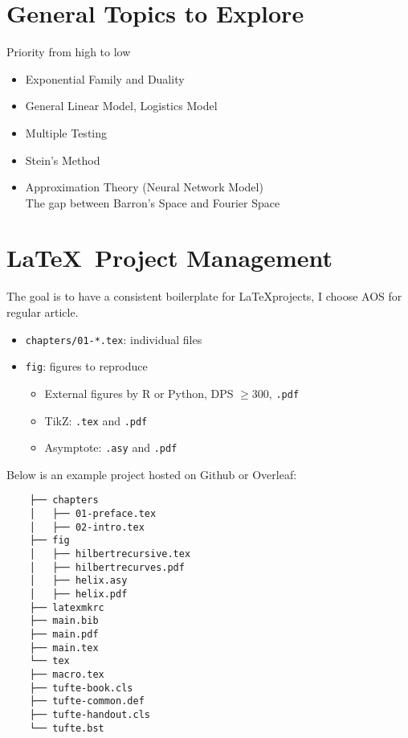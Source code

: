 \newpage

\section{General Topics to Explore}

\noindent
Priority from high to low

\begin{itemize}
    \item Exponential Family and Duality
    \item General Linear Model, Logistics Model
    \item Multiple Testing
    \item Stein's Method
    \item Approximation Theory (Neural Network Model) \\
          \hspace{1em} The gap between Barron's Space and Fourier Space
\end{itemize}


\section{\LaTeX\ Project Management}

The goal is to have a consistent boilerplate for \LaTeX projects,
I choose AOS for regular article.

\begin{itemize}
    \item \verb|chapters/01-*.tex|: individual files
    \item \verb|fig|: figures to reproduce
          \begin{itemize}
              \item External figures by \textsf{R} or Python, DPS $\geq 300$, \texttt{.pdf}
              \item TikZ: \texttt{.tex} and \texttt{.pdf}
              \item Asymptote: \texttt{.asy} and \texttt{.pdf}
          \end{itemize}
\end{itemize}

Below is an example project hosted on Github or Overleaf:

\begin{Verbatim}
    ├── chapters
    │   ├── 01-preface.tex
    │   ├── 02-intro.tex
    ├── fig
    │   ├── hilbertrecursive.tex
    │   ├── hilbertrecurves.pdf
    │   ├── helix.asy
    │   ├── helix.pdf
    ├── latexmkrc
    ├── main.bib
    ├── main.pdf
    ├── main.tex
    └── tex
    ├── macro.tex
    ├── tufte-book.cls
    ├── tufte-common.def
    ├── tufte-handout.cls
    └── tufte.bst
\end{Verbatim}

